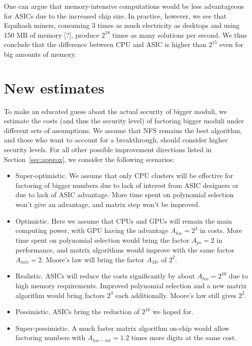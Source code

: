 \documentclass[a4paper]{article}
\begin{document}
One can argue that memory-intensive computations would be less advantageous for ASICs due to the increased chip size. In practice, however, we see that Equihash miners, consuming 3 times as much electricity as desktops and using 150 MB of memory [?], produce $2^{18}$ times as many solutions per second. We thus conclude that the difference between CPU and ASIC is higher than $2^{15}$ even for big amounts of memory.
 
 
 
 
 \section{New estimates}
 
 To make an educated guess about the actual security of bigger moduli, we estimate the costs (and thus the security level) of factoring bigger moduli under different sets of assumptions. We assume that NFS remains the best algorithm, and those who want to account for a breakthrough, should consider higher security levels. For all other possible improvement directions listed in Section~\ref{sec:approx}, we consider the following scenarios:
\begin{itemize}
    \item Super-optimistic. We assume that only CPU clusters will be effective for factoring of bigger numbers due to lack of interest from ASIC designers or due to lack of ASIC advantage. More time spent on polynomial selection won't give an advantage, and matrix step won't be improved.
    \item Optimistic. Here we assume that CPUs and GPUs will remain the main computing power, with GPU having the advantage $A_{hw}=2^3$ in costs. More time spent on polynomial selection would bring the factor $A_{ps}=2$ in performance, and matrix algorithms would improve with the same factor $A_{mtr}=2$. Moore's law will bring the factor $A_{Mr}$ of $2^2$.
    \item Realistic. ASICs will reduce the costs significantly by about $A_{hw}=2^{10}$ due to high memory requirements. Improved polynomial selection and a new matrix algorithm would bring factors $2^3$ each additionally. Moore's law still gives $2^2$.
     \item Pessimistic. ASICs bring the reduction of $2^{16}$ we hoped for.
     \item Super-pessimistic. A much faster matrix algorithm on-chip would allow factoring numbers with $A_{hw-mt}=1.2$ times more digits at the same cost.
 \end{itemize}
\end{document}
